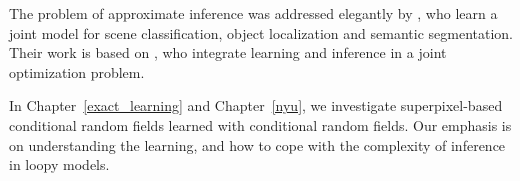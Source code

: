 The problem of approximate inference was addressed elegantly by
\citet{yao2012describing}, who learn a joint model for scene classification,
object localization and semantic segmentation.  Their work is based on
\citet{hazan2010primal}, who integrate learning and inference in a joint
optimization problem.

In Chapter~\ref{exact_learning} and Chapter~\ref{nyu}, we investigate
superpixel-based conditional random fields learned with conditional random
fields. Our emphasis is on understanding the learning, and how to cope with the
complexity of inference in loopy models.
